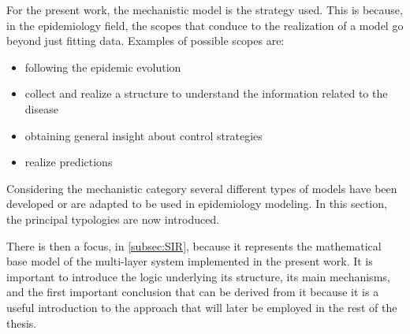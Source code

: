 For the present work, the mechanistic model is the strategy used.  This is because, in the epidemiology field, the scopes that conduce to the realization of a model go beyond just fitting data. Examples of possible scopes are:
\begin{itemize}
	\item following the epidemic evolution
	\item collect and realize a structure to understand the information related to the disease 
	\item obtaining general insight about control strategies
	\item realize predictions
\end{itemize}
Considering the mechanistic category several different types of models have been developed or are adapted to be used in epidemiology modeling. In this section, the principal typologies are now introduced. 

 There is then a focus, in \ref{subsec:SIR}, because it represents the mathematical base model of the multi-layer system implemented in the present work. It is important to introduce the logic underlying its structure, its main mechanisms, and the first important conclusion that can be derived from it because it is a useful introduction to the approach that will later be employed in the rest of the thesis.

